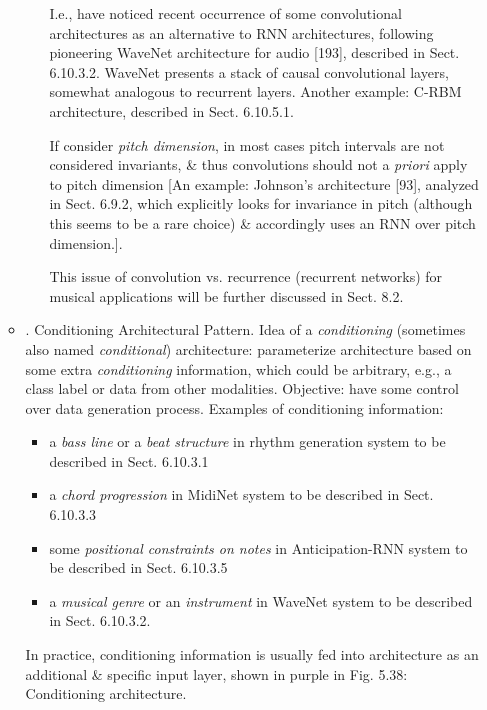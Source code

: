 \documentclass{article}
\begin{document}
\begin{itemize}
\begin{itemize}
\begin{itemize}
			I.e., have noticed recent occurrence of some convolutional architectures as an alternative to RNN architectures, following pioneering WaveNet architecture for audio [193], described in Sect. 6.10.3.2. WaveNet presents a stack of causal convolutional layers, somewhat analogous to recurrent layers. Another example: C-RBM architecture, described in Sect. 6.10.5.1.

			If consider {\it pitch dimension}, in most cases pitch intervals are not considered invariants, \& thus convolutions should not a {\it priori} apply to pitch dimension [An example: {\sc Johnson}'s architecture [93], analyzed in Sect. 6.9.2, which explicitly looks for invariance in pitch (although this seems to be a rare choice) \& accordingly uses an RNN over pitch dimension.].

			This issue of convolution vs. recurrence (recurrent networks) for musical applications will be further discussed in Sect. 8.2.
		\end{itemize}
		\item {. Conditioning Architectural Pattern.} Idea of a {\it conditioning} (sometimes also named {\it conditional}) architecture: parameterize architecture based on some extra {\it conditioning} information, which could be arbitrary, e.g., a class label or data from other modalities. Objective: have some control over data generation process. Examples of conditioning information:
		\begin{itemize}
			\item a {\it bass line} or a {\it beat structure} in rhythm generation system to be described in Sect. 6.10.3.1
			\item a {\it chord progression} in MidiNet system to be described in Sect. 6.10.3.3
			\item some {\it positional constraints on notes} in Anticipation-RNN system to be described in Sect. 6.10.3.5
			\item a {\it musical genre} or an {\it instrument} in WaveNet system to be described in Sect. 6.10.3.2.
		\end{itemize}
		In practice, conditioning information is usually fed into architecture as an additional \& specific input layer, shown in purple in {\sf Fig. 5.38: Conditioning architecture}.


\end{itemize}
\end{itemize}
\end{document}
